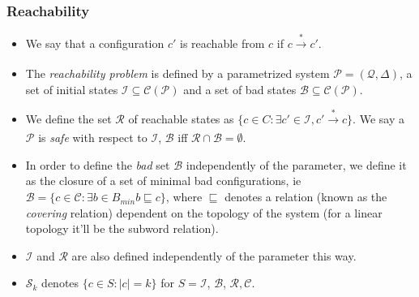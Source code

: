 \documentclass{beamer}
\begin{document}
{        \begin{frame}
            \frametitle{Reachability}
            \begin{itemize}
                \item We say that a configuration $c'$ is reachable from $c$ if $c \xrightarrow[]{*} c'$.
                \item The \textit{reachability problem} is defined by a parametrized system $\mathcal{P} = (\mathcal{Q}, \Delta)$, a set of initial states $\mathcal{I} \subseteq \mathcal{C}(\mathcal{P})$ and a set of bad states $\mathcal{B} \subseteq \mathcal{C}(\mathcal{P})$. 
                \item We define the set $\mathcal{R}$ of reachable states as $\{c \in C: \exists c' \in \mathcal{I}, c' \xrightarrow[]{*} c\}$. We say a $\mathcal{P}$ is \textit{safe} with respect to $\mathcal{I}$, $\mathcal{B}$ iff $\mathcal{R} \cap \mathcal{B} = \emptyset$.
                \item In order to define the \textit{bad} set $\mathcal{B}$ independently of the parameter, we define it as the closure of a set of minimal bad configurations, ie $\mathcal{B} = \{c \in \mathcal{C}: \exists b \in B_{min} b \sqsubseteq c\}$, where $\sqsubseteq$ denotes 
                a relation (known as the \textit{covering} relation) dependent on the topology of the system (for a linear topology it'll be the subword relation).
                \item $\mathcal{I}$ and $\mathcal{R}$ are also defined independently of the parameter this way.
                \item $\mathcal{S}_{k}$ denotes $\{c \in S: \left|c\right| = k\}$ for $S = \mathcal{I}$, $\mathcal{B}$, $\mathcal{R}, \mathcal{C}$. 
            \end{itemize}
        \end{frame}
    }
\end{document}
